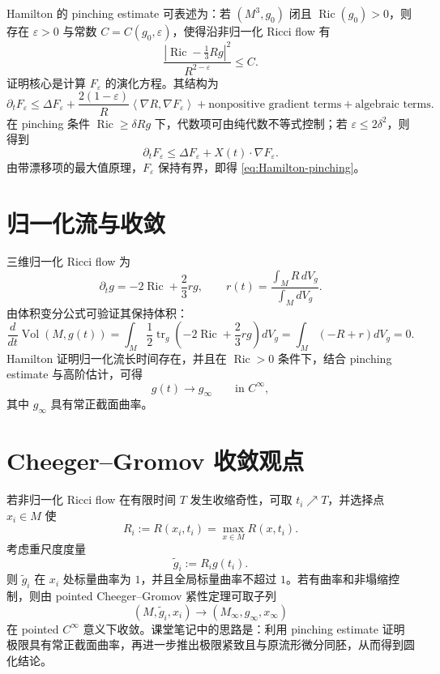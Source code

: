 \documentclass[11pt,a4paper,cn,nofont,math=cm,mode=fancy,bibtex]{elegantbook}
\numberwithin{equation}{chapter}
\numberwithin{figure}{chapter}
\newcommand{\Ric}{\operatorname{Ric}}
\newcommand{\tr}{\operatorname{tr}}
\newcommand{\Vol}{\operatorname{Vol}}
\newcommand{\norm}[1]{\left\lvert #1\right\rvert}
\newcommand{\inner}[2]{\left\langle #1,#2\right\rangle}
\begin{document}
Hamilton 的 pinching estimate 可表述为：若 $(M^3,g_0)$ 闭且 $\Ric(g_0)>0$，则存在 $\varepsilon>0$ 与常数 $C=C(g_0,\varepsilon)$，使得沿非归一化 Ricci flow 有
\begin{equation}\label{eq:Hamilton-pinching}
  \frac{\norm{\Ric-\frac13Rg}^2}{R^{2-\varepsilon}}
  \le C.
\end{equation}
证明核心是计算 $F_\varepsilon$ 的演化方程。其结构为
\begin{equation}\label{eq:Feps-evol-schematic}
  \partial_t F_\varepsilon
  \le \Delta F_\varepsilon
  +\frac{2(1-\varepsilon)}{R}\inner{\nabla R}{\nabla F_\varepsilon}
  +\text{nonpositive gradient terms}
  +\text{algebraic terms}.
\end{equation}
在 pinching 条件 $\Ric\ge\delta Rg$ 下，代数项可由纯代数不等式控制；若 $\varepsilon\le2\delta^2$，则得到
\[
  \partial_t F_\varepsilon
  \le \Delta F_\varepsilon+X(t)\cdot\nabla F_\varepsilon.
\]
由带漂移项的最大值原理，$F_\varepsilon$ 保持有界，即得 \eqref{eq:Hamilton-pinching}。

\section{归一化流与收敛}

三维归一化 Ricci flow 为
\begin{equation}\label{eq:NRF3}
  \partial_t g=-2\Ric+\frac23 r g,
  \qquad
  r(t)=\frac{\int_M R\,dV_g}{\int_M dV_g}.
\end{equation}
由体积变分公式可验证其保持体积：
\[
  \frac{d}{dt}\Vol(M,g(t))
  =\int_M\frac12\tr_g\left(-2\Ric+\frac23rg\right)dV_g
  =\int_M(-R+r)dV_g=0.
\]
Hamilton 证明归一化流长时间存在，并且在 $\Ric>0$ 条件下，结合 pinching estimate 与高阶估计，可得
\[
  g(t)\longrightarrow g_\infty
  \qquad\text{in }C^\infty,
\]
其中 $g_\infty$ 具有常正截面曲率。

\section{Cheeger--Gromov 收敛观点}

若非归一化 Ricci flow 在有限时间 $T$ 发生收缩奇性，可取 $t_i\nearrow T$，并选择点 $x_i\in M$ 使
\[
  R_i:=R(x_i,t_i)=\max_{x\in M}R(x,t_i).
\]
考虑重尺度度量
\[
  \tilde g_i:=R_i g(t_i).
\]
则 $\tilde g_i$ 在 $x_i$ 处标量曲率为 $1$，并且全局标量曲率不超过 $1$。若有曲率和非塌缩控制，则由 pointed Cheeger--Gromov 紧性定理可取子列
\[
  (M,\tilde g_i,x_i)\longrightarrow (M_\infty,g_\infty,x_\infty)
\]
在 pointed $C^\infty$ 意义下收敛。课堂笔记中的思路是：利用 pinching estimate 证明极限具有常正截面曲率，再进一步推出极限紧致且与原流形微分同胚，从而得到圆化结论。
\end{document}
